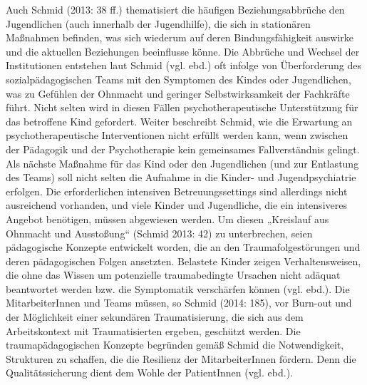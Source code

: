 Auch Schmid (2013: 38 ff.) thematisiert die häufigen Beziehungsabbrüche den Jugendlichen (auch innerhalb der Jugendhilfe), die sich in stationären Maßnahmen befinden, was sich wiederum auf deren Bindungsfähigkeit auswirke und die aktuellen Beziehungen beeinflusse könne. Die Abbrüche und Wechsel der Institutionen entstehen laut Schmid (vgl. ebd.) oft infolge von Überforderung des sozialpädagogischen Teams mit den Symptomen des Kindes oder Jugendlichen, was zu Gefühlen der Ohnmacht und geringer Selbstwirksamkeit der Fachkräfte führt. Nicht selten wird in diesen Fällen psychotherapeutische Unterstützung für das betroffene Kind gefordert. Weiter beschreibt Schmid, wie die Erwartung an psychotherapeutische Interventionen nicht erfüllt werden kann, wenn zwischen der Pädagogik und der Psychotherapie kein gemeinsames Fallverständnis gelingt. Als nächste Maßnahme für das Kind oder den Jugendlichen (und zur Entlastung des Teams) soll nicht selten die Aufnahme in die Kinder- und Jugendpsychiatrie erfolgen. Die erforderlichen intensiven Betreuungssettings sind allerdings nicht ausreichend vorhanden, und viele Kinder und Jugendliche, die ein intensiveres Angebot benötigen, müssen abgewiesen werden. Um diesen „Kreislauf aus Ohnmacht und Ausstoßung“ (Schmid 2013: 42) zu unterbrechen, seien pädagogische Konzepte entwickelt worden, die an den Traumafolgestörungen und deren pädagogischen Folgen ansetzten. Belastete Kinder zeigen Verhaltensweisen, die ohne das Wissen um potenzielle traumabedingte Ursachen nicht adäquat beantwortet werden bzw. die Symptomatik verschärfen können (vgl. ebd.). Die MitarbeiterInnen und Teams müssen, so Schmid (2014: 185), vor Burn-out und der Möglichkeit einer sekundären Traumatisierung, die sich aus dem Arbeitskontext mit Traumatisierten ergeben, geschützt werden. Die traumapädagogischen Konzepte begründen gemäß Schmid die Notwendigkeit, Strukturen zu schaffen, die die Resilienz der MitarbeiterInnen fördern. Denn die Qualitätssicherung dient dem Wohle der PatientInnen (vgl. ebd.).

